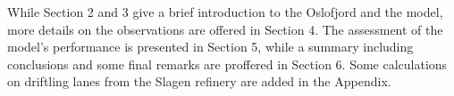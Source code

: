 While Section 2 and 3 give a brief introduction to the Oslofjord and the model, more details on the observations are offered in Section 4. The assessment of the model's performance is presented in Section 5, while a summary including conclusions and some final remarks are proffered in Section 6. Some calculations on driftling lanes from the Slagen refinery are added in the Appendix.







\newpage
